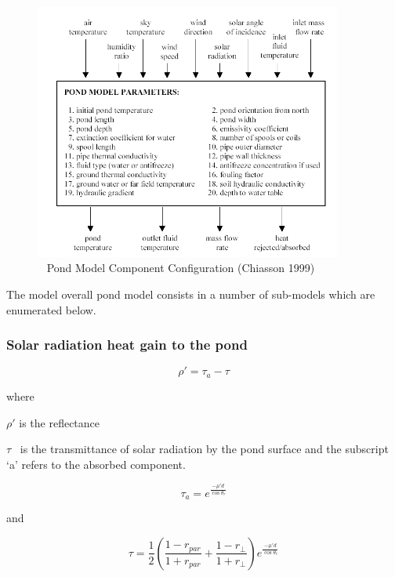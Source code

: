 \begin{figure}[hbtp] %
\centering
\includegraphics[width=0.9\textwidth, height=0.9\textheight, keepaspectratio=true]{media/image5686.png}
\caption{  Pond Model Component Configuration (Chiasson 1999) \protect \label{fig:pond-model-component-configuration-chiasson}}
\end{figure}

The model overall pond model consists in a number of sub-models which are enumerated below.

\subsubsection{Solar radiation heat gain to the pond}\label{solar-radiation-heat-gain-to-the-pond}

\begin{equation}
\rho ' = {\tau_a} - \tau
\end{equation}

where

\(\rho '\) is the reflectance

\(\tau\) ~is the transmittance of solar radiation by the pond surface and the subscript `a' refers to the absorbed component.

\begin{equation}
{\tau_a} = {e^{\frac{{ - \mu 'd}}{{\cos {\theta_r}}}}}
\end{equation}

and

\begin{equation}
\tau  = \frac{1}{2}\left( {\frac{{1 - {r_{par}}}}{{1 + {r_{par}}}} + \frac{{1 - {r_ \bot }}}{{1 + {r_ \bot }}}} \right){e^{\frac{{ - \mu 'd}}{{\cos {\theta_r}}}}}
\end{equation}


